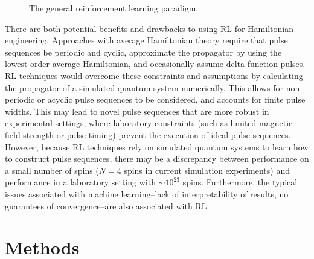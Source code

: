 \documentclass{article}
\begin{document}
\begin{figure}[ht]
    \centering
    \caption{The general reinforcement learning paradigm.}
    \label{fig:RL}
\end{figure}

There are both potential benefits and drawbacks to using RL for Hamiltonian engineering. Approaches with average Hamiltonian theory require that pulse sequences be periodic and cyclic, approximate the propagator by using the lowest-order average Hamiltonian, and occasionally assume delta-function pulses. RL techniques would overcome these constraints and assumptions by calculating the propagator of a simulated quantum system numerically. This allows for non-periodic or acyclic pulse sequences to be considered, and accounts for finite pulse widths.
This may lead to novel pulse sequences that are more robust in experimental settings, where laboratory constraints (such as limited magnetic field strength or pulse timing) prevent the execution of ideal pulse sequences.
However, because RL techniques rely on simulated quantum systems to learn how to construct pulse sequences, there may be a discrepancy between performance on a small number of spins ($N=4$ spins in current simulation experiments) and performance in a laboratory setting with $\sim10^{23}$ spins. Furthermore, the typical issues associated with machine learning--lack of interpretability of results, no guarantees of convergence--are also associated with RL.

\section{Methods}
\end{document}
